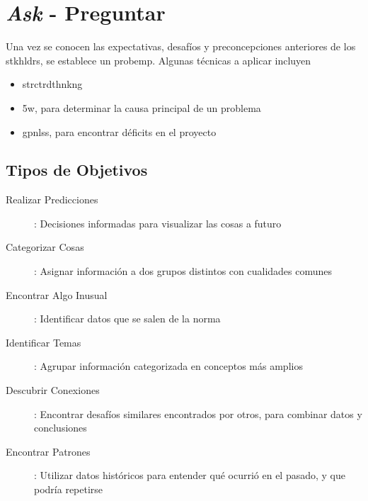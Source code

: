 \section{\textit{Ask} - Preguntar}
Una vez se conocen las expectativas, desafíos y preconcepciones anteriores de los \gls{stkhldrs}, se establece un \gls{probemp}. Algunas técnicas a aplicar incluyen
\begin{itemize}
    \item {\gls{strctrdthnkng}}
    \item {\gls{5w}, para determinar la causa principal de un problema}
    \item {\gls{gpnlss}, para encontrar déficits en el proyecto}
\end{itemize}

\subsection{Tipos de Objetivos}
\begin{description}
    \item [Realizar Predicciones]{: Decisiones informadas para visualizar las cosas a futuro}
    \item [Categorizar Cosas]{: Asignar información a dos grupos distintos con cualidades comunes}
    \item [Encontrar Algo Inusual]{: Identificar datos que se salen de la norma}
    \item [Identificar Temas]{: Agrupar información categorizada en conceptos más amplios}
    \item [Descubrir Conexiones]{: Encontrar desafíos similares encontrados por otros, para combinar datos y conclusiones}
    \item [Encontrar Patrones]{: Utilizar datos históricos para entender qué ocurrió en el pasado, y que podría repetirse}
\end{description}


